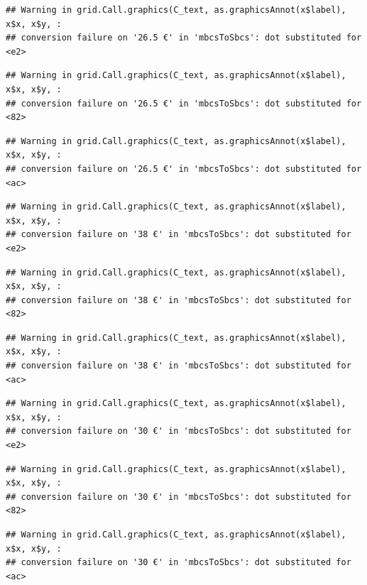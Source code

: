 \documentclass[
]{article}
\begin{document}
\begin{verbatim}
## Warning in grid.Call.graphics(C_text, as.graphicsAnnot(x$label), x$x, x$y, :
## conversion failure on '26.5 €' in 'mbcsToSbcs': dot substituted for <e2>
\end{verbatim}

\begin{verbatim}
## Warning in grid.Call.graphics(C_text, as.graphicsAnnot(x$label), x$x, x$y, :
## conversion failure on '26.5 €' in 'mbcsToSbcs': dot substituted for <82>
\end{verbatim}

\begin{verbatim}
## Warning in grid.Call.graphics(C_text, as.graphicsAnnot(x$label), x$x, x$y, :
## conversion failure on '26.5 €' in 'mbcsToSbcs': dot substituted for <ac>
\end{verbatim}

\begin{verbatim}
## Warning in grid.Call.graphics(C_text, as.graphicsAnnot(x$label), x$x, x$y, :
## conversion failure on '38 €' in 'mbcsToSbcs': dot substituted for <e2>
\end{verbatim}

\begin{verbatim}
## Warning in grid.Call.graphics(C_text, as.graphicsAnnot(x$label), x$x, x$y, :
## conversion failure on '38 €' in 'mbcsToSbcs': dot substituted for <82>
\end{verbatim}

\begin{verbatim}
## Warning in grid.Call.graphics(C_text, as.graphicsAnnot(x$label), x$x, x$y, :
## conversion failure on '38 €' in 'mbcsToSbcs': dot substituted for <ac>
\end{verbatim}

\begin{verbatim}
## Warning in grid.Call.graphics(C_text, as.graphicsAnnot(x$label), x$x, x$y, :
## conversion failure on '30 €' in 'mbcsToSbcs': dot substituted for <e2>
\end{verbatim}

\begin{verbatim}
## Warning in grid.Call.graphics(C_text, as.graphicsAnnot(x$label), x$x, x$y, :
## conversion failure on '30 €' in 'mbcsToSbcs': dot substituted for <82>
\end{verbatim}

\begin{verbatim}
## Warning in grid.Call.graphics(C_text, as.graphicsAnnot(x$label), x$x, x$y, :
## conversion failure on '30 €' in 'mbcsToSbcs': dot substituted for <ac>
\end{verbatim}
\end{document}
